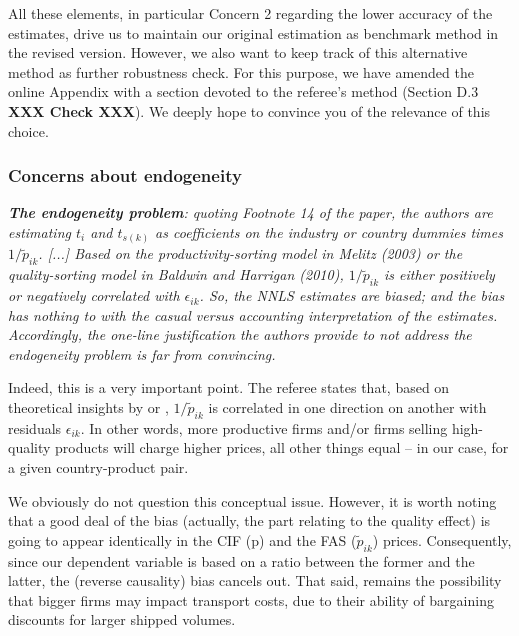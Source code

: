 \documentclass[a4paper,11pt]{article}
\begin{document}
All these elements, in particular Concern 2 regarding the lower accuracy of the estimates, drive us to maintain our original estimation as benchmark method in the revised version. However, we also want to keep track of this alternative method as further robustness check. For this purpose, we have amended the online Appendix with a section devoted to the referee's method (Section D.3 \textbf{XXX Check XXX}). We deeply hope to convince you of the relevance of this choice.



\subsubsection{Concerns about endogeneity}

\textit{\textbf{The endogeneity problem}: quoting Footnote 14 of the paper, the authors
are estimating $t_i$ and $t_{s(k)}$ as coefficients on the industry or country
dummies times $1/\widetilde{p}_{ik}$. [...] Based on the productivity-sorting model in Melitz (2003) or the quality-sorting
model in Baldwin and Harrigan (2010),  $1/\widetilde{p}_{ik}$ is either positively
or negatively correlated with $\epsilon_{ik}$. So, the NNLS estimates are biased; and
the bias has nothing to with the casual versus accounting interpretation of
the estimates. Accordingly, the one-line justification the authors provide
to not address the endogeneity problem is far from convincing.}

Indeed, this is a very important point. The referee states that, based on theoretical insights by \citet{melitz} or \citet{baldwin_harrigan}, $1/\widetilde{p}_{ik}$ is correlated in one direction on another with residuals $\epsilon_{ik}$. In other words, more productive firms and/or firms selling high-quality products will charge higher prices, all other things equal – in our case, for a given country-product pair.

We obviously do not question this conceptual issue. However, it is worth noting that a good deal of the bias (actually, the part relating to the quality effect) is going to appear identically in the CIF (p) and the FAS ($\widetilde{p}_{ik}$) prices. Consequently, since our dependent variable is based on a ratio between the former and the latter, the (reverse causality) bias cancels out. That said, remains the possibility that bigger firms may impact transport costs, due to their ability of bargaining discounts for larger shipped volumes.
\end{document}
